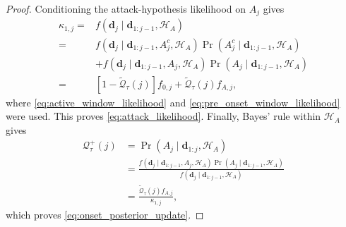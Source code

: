 \documentclass[letterpaper, 10 pt, conference]{ieeeconf}
\newcommand{\EditNA}[1]{{\color{purple} #1}}
\newcommand{\EditYW}[1]{{\color{red} #1}}
\theoremstyle{plain}
\begin{document}
\begin{proof}
    Conditioning the attack-hypothesis likelihood on $A_j$ gives
    \begin{align*}
    \kappa_{1,j} =& f\left(\mathbf{d}_j \mid \mathbf{d}_{1:j-1},\mathcal{H}_A \right)\\
    =& f\left(\mathbf{d}_j \mid \mathbf{d}_{1:j-1}, A_j^c,\mathcal{H}_A \right) \Pr\left(A_j^c \mid \mathbf{d}_{1:j-1},\mathcal{H}_A \right)\\
    &+ f\left(\mathbf{d}_j \mid \mathbf{d}_{1:j-1}, A_j,\mathcal{H}_A\right) \Pr\left(A_j \mid \mathbf{d}_{1:j-1}, \mathcal{H}_A \right)\\
    =& \left[1 - \widetilde{\mathcal{Q}}_\tau(j)\right] f_{0,j} + \widetilde{\mathcal{Q}}_\tau(j) f_{A,j},
    \end{align*}
    where \eqref{eq:active_window_likelihood} and \eqref{eq:pre_onset_window_likelihood} were used. This proves \eqref{eq:attack_likelihood}. Finally, Bayes' rule within $\mathcal H_A$ gives
\begin{align*}
\mathcal{Q}_\tau^{+}(j) &= \Pr\left(A_j \mid \mathbf{d}_{1:j},\mathcal{H}_A \right)\\
&= \frac{f\left(\mathbf{d}_j \mid \mathbf{d}_{1:j-1}, A_j,\mathcal{H}_A \right) \Pr\left(A_j \mid \mathbf{d}_{1:j-1},\mathcal{H}_A \right)}{f\left(\mathbf{d}_j \mid \mathbf{d}_{1:j-1},\mathcal{H}_A\right)}\\
&= \frac{\widetilde{\mathcal{Q}}_\tau(j) f_{A,j}}{\kappa_{1,j}},
\end{align*}
which proves \eqref{eq:onset_posterior_update}.
\end{proof}



\end{document}
